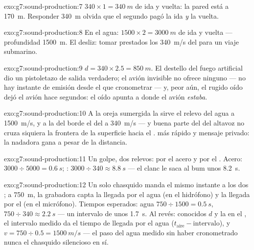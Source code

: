\begin{solution}{exo:g7:sound-production:7}
$340 \times 1 = \qty{340}{m}$ de ida y vuelta: la pared está a
\qty{170}{m}. Responder \qty{340}{m} olvida que el segundo pagó la ida
\emph{y} la vuelta.
\end{solution}

\begin{solution}{exo:g7:sound-production:8}
En el agua: $1500 \times 2 = \qty{3000}{m}$ de ida y vuelta ---
profundidad \qty{1500}{m}. El desliz: tomar prestados los
\qty{340}{m/s} del  para un viaje submarino.
\end{solution}

\begin{solution}{exo:g7:sound-production:9}
$d = 340 \times 2.5 = \qty{850}{m}$. El destello del fuego artificial
dio un pistoletazo de salida verdadero; el avión invisible no ofrece
ninguno --- no hay instante de emisión desde el que cronometrar --- y,
peor aún, el rugido oído dejó el avión hace segundos: el oído apunta a
donde el avión \emph{estaba}.
\end{solution}

\begin{solution}{exo:g7:sound-production:10}
A la oreja sumergida la sirve el relevo del agua a \qty{1500}{m/s}, y
a la del borde el del  a \qty{340}{m/s} --- y buena parte del
 del altavoz no cruza siquiera la frontera de la superficie
hacia el .  más rápido y mensaje privado: la nadadora
gana a pesar de la distancia.
\end{solution}

\begin{solution}{exo:g7:sound-production:11}
Un golpe, dos relevos: por el acero y por el . Acero: $3000 \div
5000 = \qty{0.6}{s}$; : $3000 \div 340 \approx \qty{8.8}{s}$ ---
el clanc le saca al bum unos \qty{8.2}{s}.
\end{solution}

\begin{solution}{exo:g7:sound-production:12}
Un solo chasquido manda el mismo instante a los dos ; a
\qty{750}{m}, la grabadora capta la llegada por el agua (en el
hidrófono) y la llegada por el  (en el micrófono). Tiempos
esperados: agua $750 \div 1500 = \qty{0.5}{s}$,  $750 \div 340
\approx \qty{2.2}{s}$ --- un intervalo de unos \qty{1.7}{s}. Al revés:
conocidos $d$ y la  en el , el intervalo medido da el
tiempo de llegada por el agua ($t_{\text{aire}} -
\text{intervalo}$), y $v = 750 \div 0.5 = \qty{1500}{m/s}$ --- el paso
del agua medido sin haber cronometrado nunca el chasquido silencioso
en sí.
\end{solution}

